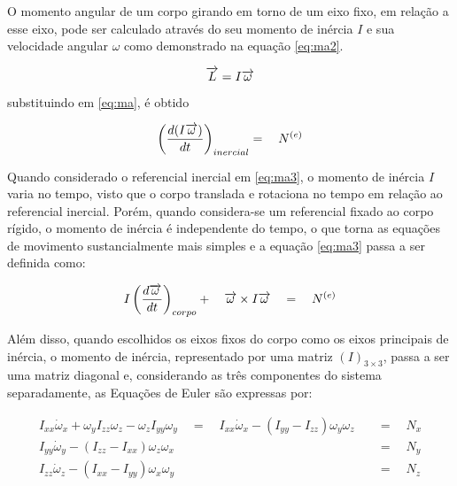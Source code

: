 \documentclass[a4paper, 12pt]{article}
\begin{document}
O momento angular de um corpo girando em torno de um eixo fixo, em relação a esse eixo, pode ser calculado através do seu momento de inércia $I$ e sua velocidade angular $\omega$ como demonstrado na equação \ref{eq:ma2}.


\begin{equation}
\centering
 \overrightarrow { L } =I\overrightarrow { \omega } 
\label{eq:ma2}
\end{equation}

\noindent substituindo em \ref{eq:ma}, é obtido 

\begin{equation}
\centering
{ \left( \frac { d(I\overrightarrow { \omega  } ) }{ dt }  \right)  }_{ inercial }=\quad { N }^{ (e) }
\label{eq:ma3}
\end{equation}

Quando considerado o referencial inercial em \ref{eq:ma3}, o momento de inércia $I$ varia no tempo, visto que o corpo translada e rotaciona no tempo em relação ao referencial inercial. Porém, quando considera-se um referencial fixado ao corpo rígido, o momento de inércia é independente do tempo, o que torna as equações de movimento sustancialmente mais simples e a equação \ref{eq:ma3} passa a ser definida como:

\begin{equation}
\centering
{ I\left( \frac { d\overrightarrow { \omega  }  }{ dt }  \right)  }_{ corpo }+\quad \overrightarrow { \omega  } \times I\overrightarrow { \omega  } \quad =\quad { N }^{ (e) }
\label{eq:ma4}
\end{equation}

Além disso, quando escolhidos os eixos fixos do corpo como os eixos principais de inércia, o momento de inércia, representado por uma matriz $(I)_{3\times3}$, passa a ser uma matriz diagonal e, considerando as três componentes do sistema separadamente, as Equações de Euler são expressas por:


\begin{equation}
\begin{aligned}
{ I }_{ xx }{ \dot { \omega  }  }_{ x }+{ \omega  }_{ y }I_{ zz }\omega _{ z }-\omega _{ z }I_{ yy }\omega _{ y }\quad =\quad { I }_{ xx }{ \dot { \omega  }  }_{ x } - (I_{ yy } - I_{ zz }){ \omega  }_{ y }{ \omega  }_{ z }\quad &=\quad N_{ x } \\
{ I }_{ yy }{ \dot { \omega  }  }_{ y } - (I_{ zz } - I_{ xx }){ \omega  }_{ z }{ \omega  }_{ x }\quad &=\quad N_{ y }\\
{ I }_{ zz }{ \dot { \omega  }  }_{ z } - (I_{ xx } - I_{ yy }){ \omega  }_{ x }{ \omega  }_{ y }\quad &=\quad N_{ z }
\end{aligned}
\label{eq:eulers}
\end{equation}
\end{document}
